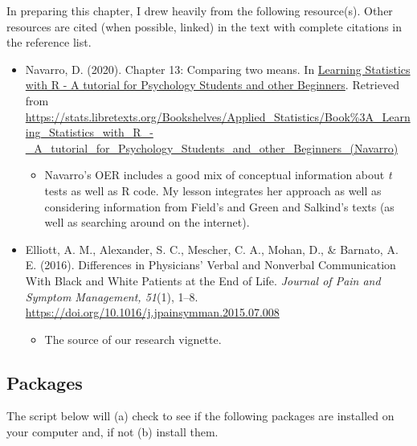 \documentclass[
  11pt,
]{book}
\providecommand{\tightlist}{%
  \setlength{\itemsep}{0pt}\setlength{\parskip}{0pt}}
\begin{document}
In preparing this chapter, I drew heavily from the following resource(s). Other resources are cited (when possible, linked) in the text with complete citations in the reference list.

\begin{itemize}
\tightlist
\item
  Navarro, D. (2020). Chapter 13: Comparing two means. In \href{https://learningstatisticswithr.com/}{Learning Statistics with R - A tutorial for Psychology Students and other Beginners}. Retrieved from \url{https://stats.libretexts.org/Bookshelves/Applied_Statistics/Book\%3A_Learning_Statistics_with_R_-_A_tutorial_for_Psychology_Students_and_other_Beginners_(Navarro)}

  \begin{itemize}
  \tightlist
  \item
    Navarro's OER includes a good mix of conceptual information about \emph{t} tests as well as R code. My lesson integrates her approach as well as considering information from Field's \citeyearpar{field_discovering_2012} and Green and Salkind's \citeyearpar{green_using_2014} texts (as well as searching around on the internet).
  \end{itemize}
\item
  Elliott, A. M., Alexander, S. C., Mescher, C. A., Mohan, D., \& Barnato, A. E. (2016). Differences in Physicians' Verbal and Nonverbal Communication With Black and White Patients at the End of Life. \emph{Journal of Pain and Symptom Management, 51}(1), 1--8. \url{https://doi.org/10.1016/j.jpainsymman.2015.07.008}

  \begin{itemize}
  \tightlist
  \item
    The source of our research vignette.
  \end{itemize}
\end{itemize}

\hypertarget{packages-2}{%
\subsection{Packages}\label{packages-2}}

The script below will (a) check to see if the following packages are installed on your computer and, if not (b) install them.
\end{document}

